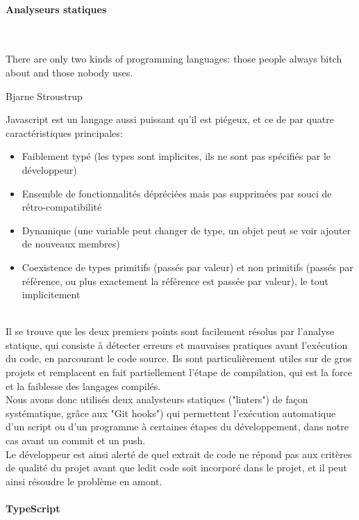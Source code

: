 \documentclass[a4paper,french,12pt]{article}
\begin{document}
	\paragraph{Analyseurs statiques}~\\	
	\epigraph{There are only two kinds of programming languages: those people always bitch about and those nobody uses.}{Bjarne Stroustrup}
	
		Javascript est un langage aussi puissant qu'il est piégeux, et ce de par quatre caractéristiques principales:~\\
		
		\begin{itemize}
			\item Faiblement typé (les types sont implicites, ils ne sont pas spécifiés par le développeur)
			\item Ensemble de fonctionnalités dépréciées mais pas supprimées par souci de rétro-compatibilité
			\item Dynamique (une variable peut changer de type, un objet peut se voir ajouter de nouveaux membres)
			\item Coexistence de types primitifs (passés par valeur) et non primitifs (passés par référence, ou plus exactement la référence est passée par valeur), le tout implicitement
		\end{itemize}	~\\	
		
		Il se trouve que les deux premiers points sont facilement résolus par l'analyse statique, qui consiste à détecter erreurs et mauvaises pratiques avant l'exécution du code, en parcourant le code source.
		Ils sont particulièrement utiles sur de gros projets et remplacent en fait partiellement l'étape de compilation, qui est la force et la faiblesse des langages compilés.~\\	
		Nous avons donc utilisés deux analysteurs statiques ("linters") de façon systématique, grâce aux "Git hooks") qui permettent l'exécution automatique d'un script ou d'un programme à certaines étapes du développement, dans notre cas avant un commit et un push.~\\	
		Le développeur est ainsi alerté de quel extrait de code ne répond pas aux critères de qualité du projet avant que ledit code soit incorporé dans le projet, et il peut ainsi résoudre le problème en amont.
		
	\paragraph{TypeScript}~\\	
	
\end{document}
